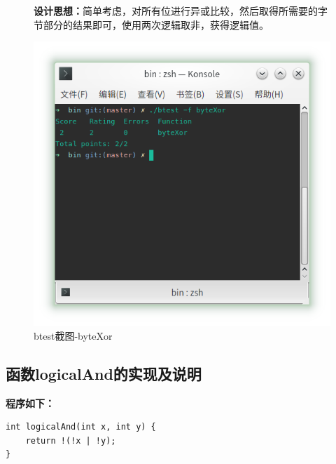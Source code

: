 \begin{figure}[H]
\begin{minipage}[c]{0.5\linewidth}
        
\textbf{设计思想：}简单考虑，对所有位进行异或比较，然后取得所需要的字节部分的结果即可，使用两次逻辑取非，获得逻辑值。
        
\end{minipage}
\begin{minipage}[c]{0.4\linewidth}
\centering
\includegraphics[width=0.9\linewidth]{figures/byteXor}
\caption{btest截图-byteXor}
\label{fig:byteXor}
\end{minipage}
\end{figure}

\subsection{函数logicalAnd的实现及说明}
\textbf{程序如下：}
\begin{verbatim}
int logicalAnd(int x, int y) {
    return !(!x | !y);
}
\end{verbatim}

